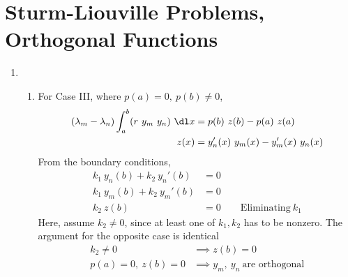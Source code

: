 \section{Sturm-Liouville Problems, Orthogonal Functions}

\begin{enumerate}
    \item \begin{enumerate}
              \item For Case III, where $ p(a) = 0 ,\ p(b) \neq 0$,
                    \begin{align}
                        (\lambda_m - \lambda_n) \int_{a}^{b} (r\ y_m\ y_n)\ \dl x
                             & = p(b) \ z(b) - p(a)\ z(a)          \\
                        z(x) & = y_n'(x)\ y_m(x) - y_m'(x)\ y_n(x)
                    \end{align}
                    From the boundary conditions,
                    \begin{align}
                        k_1\ y_n(b) + k_2\ y_n'(b) & = 0        \\
                        k_1\ y_m(b) + k_2\ y_m'(b) & = 0        \\
                        k_2\ z(b)                  & = 0 \qquad
                        \text{Eliminating}\ k_1
                    \end{align}
                    Here, assume $ k_2 \neq 0 $, since at least one of $ k_1, k_2 $ has
                    to be nonzero. The argument for the opposite case is identical
                    \begin{align}
                        k_2 \neq 0          & \implies z(b) = 0  \\
                        p(a) = 0,\ z(b) = 0 & \implies y_m,\ y_n
                        \ \text{are orthogonal}
                    \end{align}


\end{enumerate}
\end{enumerate}
